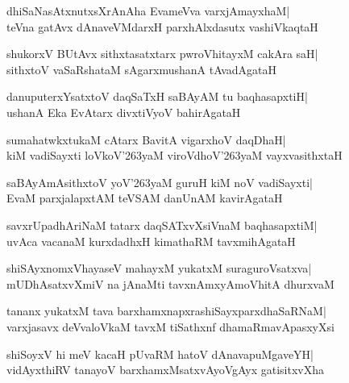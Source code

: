 \documentclass[twoside,12pt,openright]{book}
\def\S{\char'263}
\newcounter{shloka}[chapter]
\begin{document}
\begin{shloka}%
dhiSaNasAtxnutxsXrAnAha EvameVva varxjAmayxhaM|\\
teVna gatAvx dAnaveVMdarxH parxhAlxdasutx vashiVkaqtaH
\end{shloka}

\begin{shloka}%
shukorxV BUtAvx sithxtasatxtarx pwroVhitayxM cakAra saH|\\
sithxtoV vaSaRshataM sAgarxmushanA tAvadAgataH
\end{shloka}

\begin{shloka}%
danuputerxYsatxtoV daqSaTxH saBAyAM tu baqhasapxtiH|\\
ushanA Eka EvAtarx divxtiVyoV bahirAgataH
\end{shloka}

\begin{shloka}%
sumahatwkxtukaM cAtarx BavitA vigarxhoV daqDhaH|\\
kiM vadiSayxti loVkoV\S yaM viroVdhoV\S yaM vayxvasithxtaH
\end{shloka}

\begin{shloka}%
saBAyAmAsithxtoV yoV\S yaM guruH kiM noV vadiSayxti|\\
EvaM parxjalapxtAM teVSAM danUnAM kavirAgataH
\end{shloka}

\begin{shloka}%
savxrUpadhAriNaM tatarx daqSATxvXsiVnaM baqhasapxtiM|\\
uvAca vacanaM kurxdadhxH kimathaRM tavxmihAgataH
\end{shloka}

\begin{shloka}%
shiSAyxnomxVhayaseV mahayxM yukatxM suraguroVsatxva|\\
mUDhAsatxvXmiV na jAnaMti tavxnAmxyAmoVhitA dhurxvaM
\end{shloka}

\begin{shloka}%
tananx yukatxM tava barxhamxnapxrashiSayxparxdhaSaRNaM|\\
varxjasavx deVvaloVkaM tavxM tiSathxnf dhamaRmavApasxyXsi
\end{shloka}

\begin{shloka}%
shiSoyxV hi meV kacaH pUvaRM hatoV dAnavapuMgaveYH|\\
vidAyxthiRV tanayoV barxhamxMsatxvAyoVgAyx gatisitxvXha
\end{shloka}
\end{document}
